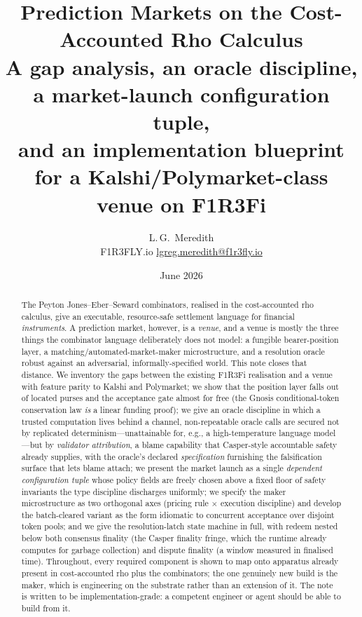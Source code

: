 \documentclass[11pt]{article}
\title{\textbf{Prediction Markets on the Cost-Accounted Rho Calculus}\\[0.3em]
\large A gap analysis, an oracle discipline, a market-launch configuration tuple,\\
and an implementation blueprint for a Kalshi/Polymarket-class venue on F1R3Fi}
\author{L.\,G.\ Meredith\\
F1R3FLY.io \quad \href{mailto:lgreg.meredith@f1r3fly.io}{lgreg.meredith@f1r3fly.io}}
\date{June 2026}
\begin{document}
\maketitle

\begin{abstract}
The Peyton Jones--Eber--Seward combinators, realised in the cost-accounted rho calculus,
give an executable, resource-safe settlement language for financial \emph{instruments}. A
prediction market, however, is a \emph{venue}, and a venue is mostly the three things the
combinator language deliberately does not model: a fungible bearer-position layer, a
matching/automated-market-maker microstructure, and a resolution oracle robust against an
adversarial, informally-specified world. This note closes that distance. We inventory the
gaps between the existing F1R3Fi realisation and a venue with feature parity to Kalshi and
Polymarket; we show that the position layer falls out of located purses and the acceptance
gate almost for free (the Gnosis conditional-token conservation law \emph{is} a linear
funding proof); we give an oracle discipline in which a trusted computation lives behind a
channel, non-repeatable oracle calls are secured not by replicated determinism---unattainable
for, e.g., a high-temperature language model---but by \emph{validator attribution}, a blame
capability that Casper-style accountable safety already supplies, with the oracle's
declared \emph{specification} furnishing the falsification surface that lets blame attach;
we present the market launch as a single \emph{dependent configuration tuple} whose policy
fields are freely chosen above a fixed floor of safety invariants the type discipline
discharges uniformly; we specify the maker microstructure as two orthogonal axes (pricing
rule $\times$ execution discipline) and develop the batch-cleared variant as the form
idiomatic to concurrent acceptance over disjoint token pools; and we give the
resolution-latch state machine in full, with redeem nested below both consensus finality
(the Casper finality fringe, which the runtime already computes for garbage collection) and
dispute finality (a window measured in finalised time). Throughout, every required component
is shown to map onto apparatus already present in cost-accounted rho plus the combinators;
the one genuinely new build is the maker, which is engineering on the substrate rather than
an extension of it. The note is written to be implementation-grade: a competent engineer or
agent should be able to build from it.
\end{abstract}
\end{document}
